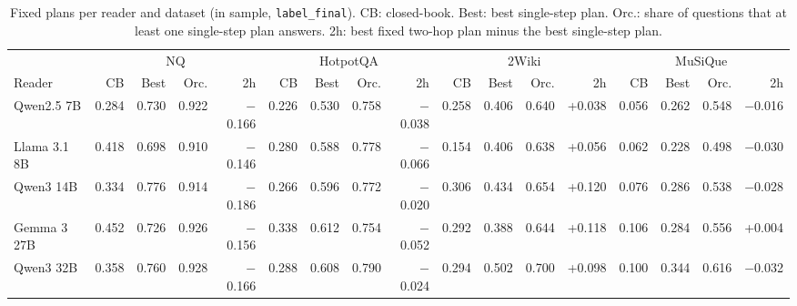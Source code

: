 \begin{table}[t]
\centering\footnotesize
\setlength{\tabcolsep}{2.6pt}
\caption{Fixed plans per reader and dataset (in sample, \texttt{label\_final}). CB: closed-book. Best: best single-step plan. Orc.: share of questions that at least one single-step plan answers. 2h: best fixed two-hop plan minus the best single-step plan.}
\label{tab:p_plans}
\begin{tabular*}{\linewidth}{@{\extracolsep{\fill}}lrrrrrrrrrrrrrrrr@{}}
\toprule
 & \multicolumn{4}{c}{NQ} & \multicolumn{4}{c}{HotpotQA} & \multicolumn{4}{c}{2Wiki} & \multicolumn{4}{c}{MuSiQue} \\
\cmidrule(lr){2-5}\cmidrule(lr){6-9}\cmidrule(lr){10-13}\cmidrule(l){14-17}
Reader & CB & Best & Orc. & 2h & CB & Best & Orc. & 2h & CB & Best & Orc. & 2h & CB & Best & Orc. & 2h \\
\midrule
Qwen2.5 7B & 0.284 & 0.730 & 0.922 & $-$0.166 & 0.226 & 0.530 & 0.758 & $-$0.038 & 0.258 & 0.406 & 0.640 & +0.038 & 0.056 & 0.262 & 0.548 & $-$0.016 \\
Llama 3.1 8B & 0.418 & 0.698 & 0.910 & $-$0.146 & 0.280 & 0.588 & 0.778 & $-$0.066 & 0.154 & 0.406 & 0.638 & +0.056 & 0.062 & 0.228 & 0.498 & $-$0.030 \\
Qwen3 14B & 0.334 & 0.776 & 0.914 & $-$0.186 & 0.266 & 0.596 & 0.772 & $-$0.020 & 0.306 & 0.434 & 0.654 & +0.120 & 0.076 & 0.286 & 0.538 & $-$0.028 \\
Gemma 3 27B & 0.452 & 0.726 & 0.926 & $-$0.156 & 0.338 & 0.612 & 0.754 & $-$0.052 & 0.292 & 0.388 & 0.644 & +0.118 & 0.106 & 0.284 & 0.556 & +0.004 \\
Qwen3 32B & 0.358 & 0.760 & 0.928 & $-$0.166 & 0.288 & 0.608 & 0.790 & $-$0.024 & 0.294 & 0.502 & 0.700 & +0.098 & 0.100 & 0.344 & 0.616 & $-$0.032 \\
\bottomrule
\end{tabular*}
\end{table}
